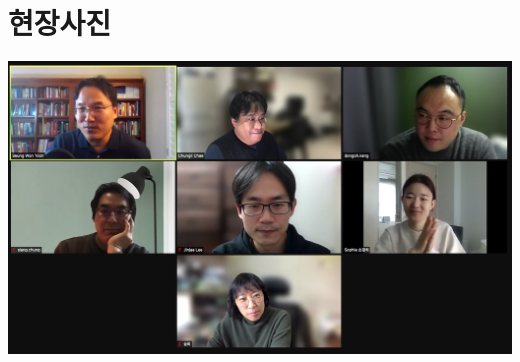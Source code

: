 \documentclass[
]{book}
\begin{document}
\hypertarget{uxd604uxc7a5uxc0acuxc9c4}{%
\section{현장사진}\label{uxd604uxc7a5uxc0acuxc9c4}}

\includegraphics{img/session1.png}

  
\end{document}

